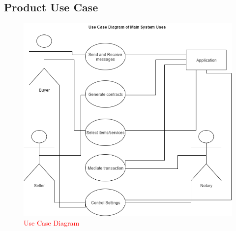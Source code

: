 \documentclass{article}
\begin{document}
\subsection{Product Use Case}
\begin{figure}[H]
	\includegraphics[scale=0.5]{usecase}
	\caption{\textcolor{red}{Use Case Diagram}}
\end{figure}

\end{document}
